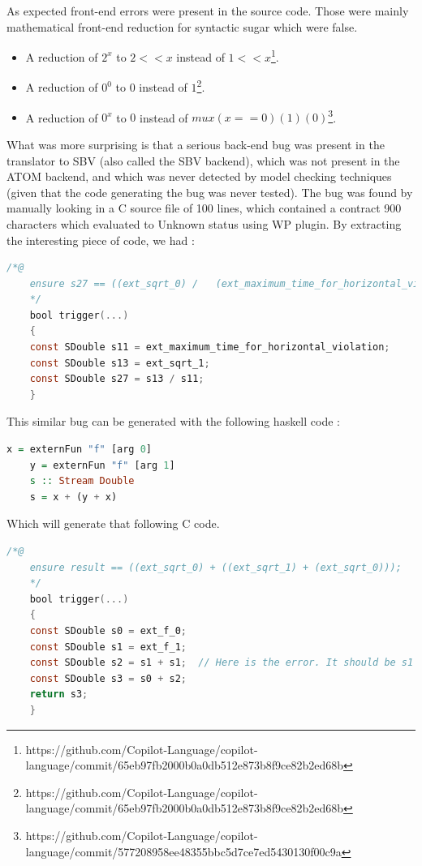 \documentclass[a4paper,11pt,final]{article}
\begin{document}
	As expected front-end errors were present in the source code. Those were mainly mathematical front-end reduction for syntactic sugar which were false.
	
	\begin{itemize}
		\item A reduction of $2^x$ to $2 << x$ instead of $1 << x$\footnote{https://github.com/Copilot-Language/copilot-language/commit/65eb97fb2000b0a0db512e873b8f9ce82b2ed68b}.
		\item A reduction of $0^0$ to $0$ instead of $1$\footnote{https://github.com/Copilot-Language/copilot-language/commit/65eb97fb2000b0a0db512e873b8f9ce82b2ed68b}.
		\item A reduction of $0^x$ to $0$ instead of $mux (x==0) (1) (0)$\footnote{https://github.com/Copilot-Language/copilot-language/commit/577208958ee48355bbc5d7ce7ed5430130f00c9a}.
	\end{itemize}
	
	What was more surprising is that a serious back-end bug was present in the translator to SBV (also called the SBV backend), which was not present in the ATOM backend, and which was never detected by model checking techniques (given that the code generating the bug was never tested). The bug was found by manually looking in a C source file of 100 lines, which contained a contract 900 characters which evaluated to Unknown status using WP plugin. By extracting the interesting piece of code, we had :
	\begin{lstlisting}[language=C, keywordstyle=\color{blue}]
	/*@
	ensure s27 == ((ext_sqrt_0) /   (ext_maximum_time_for_horizontal_violation));
	*/
	bool trigger(...)
	{
	const SDouble s11 = ext_maximum_time_for_horizontal_violation;
	const SDouble s13 = ext_sqrt_1;
	const SDouble s27 = s13 / s11;
	}  \end{lstlisting}
	This similar bug can be generated with the following haskell code :
	\begin{lstlisting}[language=Haskell]
	x = externFun "f" [arg 0]
	y = externFun "f" [arg 1]
	s :: Stream Double
	s = x + (y + x)
	\end{lstlisting}
	Which will generate that following C code.
	\begin{lstlisting}[language=C, keywordstyle=\color{blue}]
	/*@
	ensure result == ((ext_sqrt_0) + ((ext_sqrt_1) + (ext_sqrt_0)));
	*/
	bool trigger(...)
	{
	const SDouble s0 = ext_f_0;
	const SDouble s1 = ext_f_1;
	const SDouble s2 = s1 + s1;  // Here is the error. It should be s1 + s0;
	const SDouble s3 = s0 + s2;
	return s3;
	}  \end{lstlisting}
	
\end{document}
